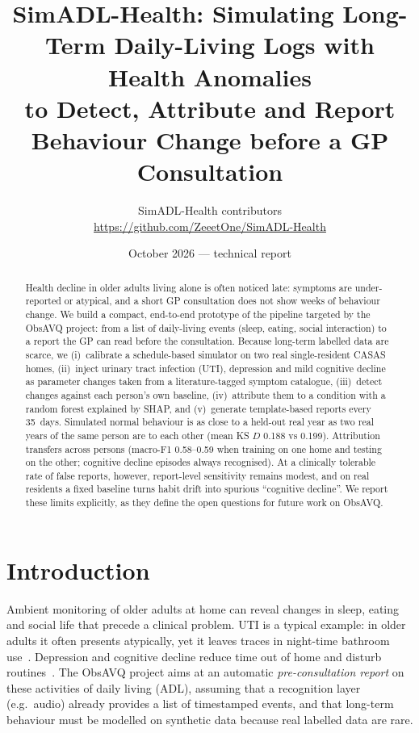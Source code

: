 \documentclass[10pt,a4paper]{article}
\title{\textbf{SimADL-Health}: Simulating Long-Term Daily-Living Logs with Health Anomalies\\
to Detect, Attribute and Report Behaviour Change before a GP Consultation}
\author{SimADL-Health contributors\\ \small \url{https://github.com/ZeeetOne/SimADL-Health}}
\date{October 2026 --- technical report}
\begin{document}
\maketitle

\begin{abstract}
Health decline in older adults living alone is often noticed late: symptoms are under-reported or atypical, and a short
GP consultation does not show weeks of behaviour change. We build a compact, end-to-end prototype of the pipeline
targeted by the ObsAVQ project: from a list of daily-living events (sleep, eating, social interaction) to a report the GP
can read before the consultation. Because long-term labelled data are scarce, we (i)~calibrate a schedule-based simulator
on two real single-resident CASAS homes, (ii)~inject urinary tract infection (UTI), depression and mild cognitive decline
as parameter changes taken from a literature-tagged symptom catalogue, (iii)~detect changes against each person's own
baseline, (iv)~attribute them to a condition with a random forest explained by SHAP, and (v)~generate template-based
reports every 35~days. Simulated normal behaviour is as close to a held-out real year as two real years of the same person
are to each other (mean KS $D$ 0.188 vs 0.199). Attribution transfers across persons (macro-F1 0.58--0.59 when training on
one home and testing on the other; cognitive decline episodes always recognised). At a clinically tolerable rate of
false reports, however, report-level sensitivity remains modest, and on real residents a fixed baseline turns habit
drift into spurious ``cognitive decline''. We report these limits explicitly, as they define the open questions
for future work on ObsAVQ.
\end{abstract}

\section{Introduction}
Ambient monitoring of older adults at home can reveal changes in sleep, eating and social life that precede a clinical
problem. UTI is a typical example: in older adults it often presents atypically, yet it leaves traces in night-time
bathroom use~\cite{capstick2024uti,ugwu2026clinician}. Depression and cognitive decline reduce time out of home and
disturb routines~\cite{petersen2015timeout}. The ObsAVQ project aims at an automatic \emph{pre-consultation report} on
these activities of daily living (ADL), assuming that a recognition layer (e.g.\ audio) already provides a list of
timestamped events, and that long-term behaviour must be modelled on synthetic data because real labelled data are rare.
\end{document}
